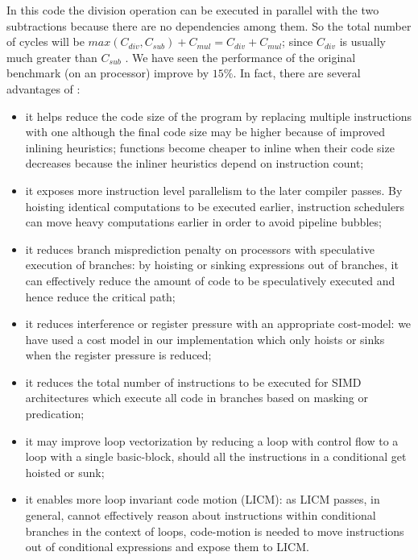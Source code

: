 \documentclass[sigplan,10pt,review,anonymous]{acmart}\settopmatter{printfolios=true,printccs=false,printacmref=false}
\begin{document}
In this code the division operation can be executed in parallel with the two
subtractions because there are no dependencies among them. So the total number
of cycles will be $max(C_{div}, C_{sub}) + C_{mul} = C_{div} + C_{mul}$; since
$C_{div}$ is usually much greater than $C_{sub}$ \cite{x86,aarch64}. We have
seen the performance of the original benchmark (on an \ooo{} processor) improve
by $15\%$.  In fact, there are several advantages of \GCM{}:
\begin{itemize}[leftmargin=*,topsep=0pt]
\item it helps reduce the code size of the program by replacing multiple
  instructions with one although the final code size may be higher because of
  improved inlining heuristics; functions become cheaper to inline when their
  code size decreases because the inliner heuristics depend on instruction
  count;
\item it exposes more instruction level parallelism to the later compiler
  passes. By hoisting identical computations to be executed earlier, instruction
  schedulers can move heavy computations earlier in order to avoid pipeline
  bubbles;
\item it reduces branch misprediction penalty on \ooo{} processors with
  speculative execution of branches: by hoisting or sinking expressions out of
  branches, it can effectively reduce the amount of code to be speculatively
  executed and hence reduce the critical path;
\item it reduces interference or register pressure with an appropriate
  cost-model: we have used a cost model in our implementation which only hoists
  or sinks when the register pressure is reduced;
\item it reduces the total number of instructions to be executed for SIMD
  architectures which execute all code in branches based on masking or
  predication;
\item it may improve loop vectorization by reducing a loop with control flow to
  a loop with a single basic-block, should all the instructions in a conditional get
  hoisted or sunk;
\item it enables more loop invariant code motion (LICM): as LICM passes, in
  general, cannot effectively reason about instructions within conditional
  branches in the context of loops, code-motion is needed to move instructions
  out of conditional expressions and expose them to LICM.
\end{itemize}
\end{document}
